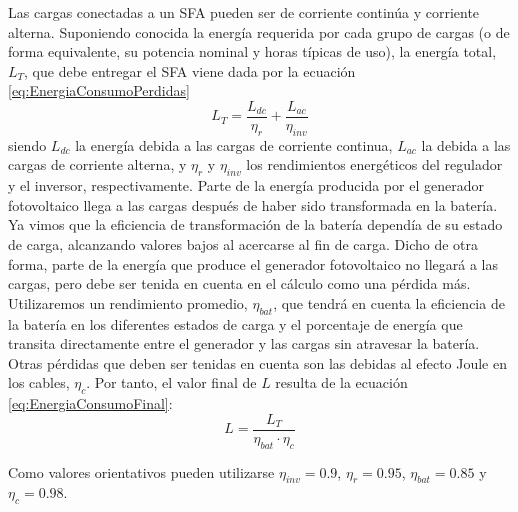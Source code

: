 Las cargas conectadas a un SFA pueden ser de corriente continúa y
corriente alterna. Suponiendo conocida la energía requerida por cada
grupo de cargas (o de forma equivalente, su potencia nominal y horas
típicas de uso), la energía total, $L_{T}$, que debe entregar el
SFA viene dada por la ecuación \ref{eq:EnergiaConsumoPerdidas}\begin{equation}
L_{T}=\frac{L_{dc}}{\eta_{r}}+\frac{L_{ac}}{\eta_{inv}}\label{eq:EnergiaConsumoPerdidas}\end{equation}
siendo $L_{dc}$ la energía debida a las cargas de corriente continua,
$L_{ac}$ la debida a las cargas de corriente alterna, y $\eta_{r}$
y $\eta_{inv}$
los rendimientos energéticos del regulador y el inversor, respectivamente.
Parte de la energía producida por el generador fotovoltaico llega
a las cargas después de haber sido transformada en la batería. Ya
vimos que la eficiencia de transformación de la batería dependía de
su estado de carga, alcanzando valores bajos al acercarse al fin de
carga. Dicho de otra forma, parte de la energía que produce el generador
fotovoltaico no llegará a las cargas, pero debe ser tenida en cuenta
en el cálculo como una pérdida más. Utilizaremos un rendimiento promedio,
$\eta_{bat}$, que tendrá en cuenta la eficiencia de la batería en
los diferentes estados de carga y el porcentaje de energía que transita
directamente entre el generador y las cargas sin atravesar la batería.
Otras pérdidas que deben ser tenidas en cuenta son las debidas al
efecto Joule en los cables, $\eta_{c}$. Por tanto, el valor final
de $L$ resulta de la ecuación \ref{eq:EnergiaConsumoFinal}:\begin{equation}
L=\frac{L_{T}}{\eta_{bat}\cdot\eta_{c}}\label{eq:EnergiaConsumoFinal}\end{equation}

Como valores orientativos pueden utilizarse $\eta_{inv}=0.9$, $\eta_{r}=0.95$,
$\eta_{bat}=0.85$ y $\eta_{c}=0.98$.

